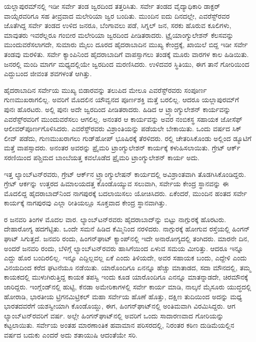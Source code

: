 ಯಲ್ಲಾಪುರಮ್‌ನಲ್ಲಿ ಇಡೀ ಸರ್ವೇ ತಂಡ ಜ್ವರದಿಂದ ತತ್ತರಿಸಿತು. ಸರ್ವೇ ತಂಡದ ವೈದ್ಯಾಧಿಕಾರಿ ಡಾಕ್ಟರ್​ ವಾಯ್ಸೆರವರಿಗೂ ಸಹ ತೀವ್ರವಾದ ಮಲೇರಿಯಾ ಜ್ವರ ಬಂದಿತು. ಮುಂದಿನ ಐದು ದಿನದಲ್ಲೇ, ಎವರೆಸ್ಟ್​ರವರ ಜೊತೆಗಿದ್ದ ಸರ್ವೇ ತಂಡದ ಉಳಿದ  ಜನರೂ, ಬೆಂಗಾವಲು ಪಡೆ, ಸಿಗ್ನಲ್​ ಜನ, ಸರಕು ಹೊರುವ ಕೂಲಿಗಳು, ಮಾವುತರು ಇವರೆಲ್ಲರೂ ಗಂಬೀರ ಮಲೇರಿಯಾ ಜ್ವರದಿಂದ ಪೀಡಿತರಾದರು. ಟ್ರೈಯಾಂಗ್ಯುಲೇಶನ್​ ಕೆಲಸವನ್ನು ಮುಂದುವರೆಸಲಾಗದೇ, ಸುಮಾರು  ಮೈಲು ದೂರದ ಹೈದರಾಬಾದಿನ ಮುಖ್ಯ ಕೇಂದ್ರಕ್ಕೆ, ಖಾಯಿಲೆ ಬಿದ್ದ ಇಡೀ ಸರ್ವೇ ತಂಡವು ಮರಳಿತು. ಸರ್ವೇ ಕ್ಯಾಂಪಿನಿಂದ ಹೈದರಾಬಾದಿಗೆ ವಾಪಸ್ಸಾಗಲು ತಂಡಕ್ಕೆ ಮೂರು ವಾರಗಳ ಕಾಲ ಹಿಡಿಯಿತು.  ಜನರಲ್ಲಿ  ಮಂದಿ ಮಾರ್ಗ ಮಧ್ಯದಲ್ಲಿಯೇ ಜ್ವರದಿಂದ ಮರಣಿಸಿದರು. ಉಳಿದವರ ಸ್ಥಿತಿಯು, ಈಗ ತಾನೆ ಗೋರಿಯಿಂದ ಎದ್ದುಬಂದ ಜೀವಂತ ಶವಗಳಂತೆ ಆಗಿತ್ತು.

ಹೈದರಾಬಾದಿನ ಸರ್ವೇಯ ಮುಖ್ಯ ಬಿಡಾರವನ್ನು ತಲುಪಿದ ಮೇಲೂ ಎವರೆಸ್ಟ್​ರವರು ಸಂಪೂರ್ಣ ಗುಣಮುಖರಾಗಲಿಲ್ಲ. ಅವರಿಗೆ ಮೊದಲಿನ ಯೌವ್ವನದ ಪೂರ್ಣಶಕ್ತಿ ಮತ್ತೆ ಬರಲಿಲ್ಲ. ಆದರೂ ಯಲ್ಲಾಪುರಮ್‌ಗೆ ಪುನಃ ಹೊರಟರು. ಅಲ್ಲಿ ಪುನಃ ಅದೇ ಜ್ವರದಿಂದ ಪೀಡಿತರಾದರು. ಹಿಡಿದ ಆ ಟ್ರ್ಯಾಂಗ್ಯುಲೇಶನ್​ ಕಾರ್ಯವನ್ನು ಎವರೆಸ್ಟ್​ರವರಿಗೆ ಮುಂದುವರೆಸಲು ಆಗಲಿಲ್ಲ. ಅನಂತರ ಆ ಕಾರ್ಯವನ್ನು ಅವರ ನಂಬಿಕಸ್ಥ ಸಹಾಯಕ ಜೋಸೆಫ್​ ಆಲೀವರ್​ ಪೂರ್ಣಗೊಳಿಸಿದರು. ಎವರೆಸ್ಟ್​ರವರು ವಿಶ್ರಾಂತಿಯನ್ನು ಪಡೆಯಲೇ ಬೇಕಾಯಿತು. ಒಂದು ವರ್ಷದ ಸಿಕ್​ ಲೀವ್​ ಪಡೆದು, ಗುಣಮುಖರಾಗಲು ಗುಡ್​ಹೋಪ್​ ಭೂಷಿರಕ್ಕೆ ತೆರಳಿದರು. ರಲ್ಲಿ ಚೇತರಿಸಿಕೊಂಡು ಅಲ್ಲಿಂದ ಡ್ಯೂಟಿಗೆ ಮತ್ತೆ ವಾಪಸ್ಸಾದರು. ಅನಂತರ ಅವರನ್ನು ಪ್ರೈಮರಿ ಟ್ರಾಂಗ್ಯುಲೇಶನ್​ ಕಾರ್ಯಕ್ಕೆ ಕಳುಹಿಸಲಾಯಿತು. ಗ್ರೇಟ್​ ಆರ್ಕ್ ಸರಣಿಯಿಂದ ಪಶ್ಚಿಮದ ಬಾಂಬೆಯತ್ತ ಕವಲೊಡೆದ ಪ್ರೈಮರಿ ಟ್ರಾಂಗ್ಯುಲೇಶನ್​ ಕಾರ್ಯ ಅದು.

ಇತ್ತ ಲ್ಯಾಂಬ್​ಟನ್​ರವರು, ಗ್ರೇಟ್​ ಆರ್ಕ್‌ನ ಟ್ರ್ಯಾಂಗ್ಯುಲೇಷನ್​ ಕಾರ್ಯದಲ್ಲಿ ಅವಿಶ್ರಾಂತವಾಗಿ ತೊಡಗಿಸಿಕೊಂಡಿದ್ದರು. ಗ್ರೇಟ್​ ಆರ್ಕನ್ನು ಉತ್ತರದ ಹಿಮಾಲಯದತ್ತ ಕೊಂಡೊಯ್ಯುವ ಸಲುವಾಗಿ, ಸರ್ವೇಯ ಕೇಂದ್ರ ಸ್ಥಾನವನ್ನು ಈ ಮೊದಲಿದ್ದ ಹೈದರಾಬಾದ್​ನಿಂದ ನಾಗಪುರಕ್ಕೆ ಬದಲಾಯಿಸಲು ಯೋಚಿಸಿದರು. ಏಕೆಂದರೆ, ಮುಂದಿನ ಹಂತದ ಸರ್ವೇ ಕಾರ್ಯಕ್ಕೆ ನಾಗಪುರವು ಎಲ್ಲಾ ರೀತಿಯಲ್ಲೂ ಸೂಕ್ತವಾದ ಕೇಂದ್ರ ಸ್ಥಾನವಾಗಿತ್ತು.

ರ ಜನವರಿ ತಿಂಗಳ ಮೊದಲ ವಾರ. ಲ್ಯಾಂಬ್​ಟನ್​ರವರು ಹೈದರಾಬಾದ್​ನ್ನು ಬಿಟ್ಟು ನಾಗ್ಪುರಕ್ಕೆ ಹೊರಟರು. ದೇಹಾರೋಗ್ಯ ಹದಗೆಟ್ಟಿತು. ಒಂದೇ ಸಮನೆ ಹಿಡಿದ ಕೆಮ್ಮಿನಿಂದ ನರಳಿದರು. ನಾಗ್ಪುರಕ್ಕೆ ಹೋಗುವ ರಸ್ತೆಯಲ್ಲಿ ಹಿಂಗನ್​ ಘಾಟ್​ ಸಿಗುತ್ತದೆ. ಜನವರಿ  ರಂದು, ಹಿಂಗನ್​ಘಾಟ್​ ಕ್ಯಾಂಪ್​ನಲ್ಲಿ ಇದೇ ಅನಾರೋಗ್ಯದಲ್ಲಿ ತಂಗಿದರು. ಮಾರನೇ ದಿನ, ಅಂದರೆ  ಜನವರಿ  ರಂದು, ಬೆಳಿಗ್ಗೆ ಲ್ಯಾಂಬ್​ಟನ್​ರವರು ಹಾಸಿಗೆಯಿಂದ ಏಳುವ ಸಮಯ ಮೀರಿತ್ತು. ಆದರೂ ಇನ್ನೂ ಎದ್ದು ಹೊರ ಬಂದಿರಲಿಲ್ಲ. ಇನ್ನೂ ಎದ್ದಿಲ್ಲವಲ್ಲ ಏಕೆ ಎಂದು ತಿಳಿಯದೇ, ಅವರ ಸಹಾಯಕ ಬಂದು, ಎದ್ದೇಳಿ ಎಂದು ವಿನಯದಿಂದ ಕರೆದ ಘಟನೆಯೂ ನಡೆಯಿತು. ಯಾರೊಂದಿಗೂ ಏನನ್ನೂ ಹೆಚ್ಚು ಮಾತಾಡದ, ಸದಾ ಮೌನದಲ್ಲಿ, ತಮ್ಮ ಕಾಯಕದಲ್ಲಿ ಮುಳುಗಿರುತ್ತಿದ್ದ ಕಾಯಕ ತಪಸ್ವಿ ಇಂದು ಕೂಡ ಯಾರೊಂದಿಗೂ ಎನನ್ನೂ ಮಾತನ್ನಾಡದೇ, ಚಿರಮೌನಕ್ಕೆ ಜಾರಿದ್ದರು. ಇಂಗ್ಲೆಂಡ್​ನಲ್ಲಿ ಹುಟ್ಟಿ, ಕೆನಡಾ ಅಮೇರಿಕಾಗಳಲ್ಲಿ ಸರ್ವೇ ಕಾರ್ಯ ಮಾಡಿ, ನಾಲ್ಕನೆ ಮೈಸೂರು ಯುದ್ಧದಲ್ಲಿ ಹೋರಾಡಿ, ಭಾರತೀಯ ಟ್ರಿಗನಮಿಟ್ರಿಕಲ್​ ಮಹಾ ಸರ್ವೇಯ ಹೊಣೆ ಹೊತ್ತು, ದಕ್ಷಿಣ ತುದಿಯಿಂದ ಅದನ್ನು ಮಧ್ಯ ಭಾರತದವರೆಗೆ ಯಶಸ್ವೀಯಾಗಿ ಕೊಂಡೊಯ್ದು, ಈಗ, ಹಿಂಗನ್​ಘಾಟ್​ನಲ್ಲಿ ಅಂತಿಮವಾಗಿ ವಿರಮಿಸಿದ್ದರು. ಆಗ ಲ್ಯಾಂಬ್​ಟನ್​ರವರಿಗೆ  ವರ್ಷ. ಅಲ್ಲೇ ಹಿಂಗನ್​ಘಾಟ್​ನಲ್ಲಿ ಅವರಿಗೆ ಒಂದು ಸಾದಾರಣವಾದ ಗೋರಿಯನ್ನು ಕಟ್ಟಲಾಯಿತು. ಸರ್ವೇಯ ಅಂತಹ ಮಾರಣಾಂತಿಕ ಹವಾಮಾನ ಪರಿಸರದಲ್ಲಿ, ನಿರಂತರ ಕಠಿಣ ದುಡಿಮೆಯಲ್ಲಿನ  ವರ್ಷದ ಬದುಕು ಎಂದರೆ ಅದು ಶತಾಯುಷಿ ಆದಂತೆಯೇ ಸರಿ.

